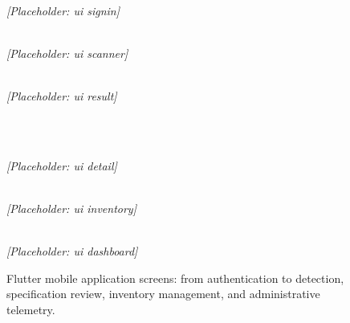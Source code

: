 \begin{figure}[htbp]
  \centering
  \begin{minipage}[t]{0.30\linewidth}
    \centering
    \framebox[\linewidth]{\rule{0pt}{4cm}}
    \\[4pt]
    {\small\textit{[Placeholder: ui signin]}}  
  
    \caption*{(a) Sign-in screen}
  \end{minipage}
  \hfill
  \begin{minipage}[t]{0.30\linewidth}
    \centering
    \framebox[\linewidth]{\rule{0pt}{4cm}}
    \\[4pt]
    {\small\textit{[Placeholder: ui scanner]}}  
  
    \caption*{(b) Video upload \& scanning}
  \end{minipage}
  \hfill
  \begin{minipage}[t]{0.30\linewidth}
    \centering
    \framebox[\linewidth]{\rule{0pt}{4cm}}
    \\[4pt]
    {\small\textit{[Placeholder: ui result]}}  
  
    \caption*{(c) Detection result card}
  \end{minipage}
  \\[1em]
  \begin{minipage}[t]{0.30\linewidth}
    \centering
    \framebox[\linewidth]{\rule{0pt}{4cm}}
    \\[4pt]
    {\small\textit{[Placeholder: ui detail]}}  
  
    \caption*{(d) Equipment detail \& spec sheet}
  \end{minipage}
  \hfill
  \begin{minipage}[t]{0.30\linewidth}
    \centering
    \framebox[\linewidth]{\rule{0pt}{4cm}}
    \\[4pt]
    {\small\textit{[Placeholder: ui inventory]}}  
  
    \caption*{(e) Saved inventory list}
  \end{minipage}
  \hfill
  \begin{minipage}[t]{0.30\linewidth}
    \centering
    \framebox[\linewidth]{\rule{0pt}{4cm}}
    \\[4pt]
    {\small\textit{[Placeholder: ui dashboard]}}  
  
    \caption*{(f) Admin dashboard \& KPIs}
  \end{minipage}
  \caption{Flutter mobile application screens: from authentication to detection, specification review, inventory management, and administrative telemetry.}
  \label{fig:ch4-ui}
\end{figure}

